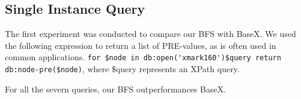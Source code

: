 \subsection{Single Instance Query}

The first experiment was conducted to compare our BFS with BaseX. We used the
following expression to return a list of PRE-values, as is often used in common
applications.    
\verb|for $node in db:open('xmark160')$query return db:node-pre($node)|, 
where \$query represents an XPath query.

For all the severn queries, our BFS outperformances BaseX.